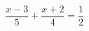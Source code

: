 \begin{ex}[type=equation]
	\begin{condition}
		$\dfrac{x- 3}{5}+\dfrac{x+2}{4} = \dfrac{1}{2}$
	\end{condition}
\end{ex}